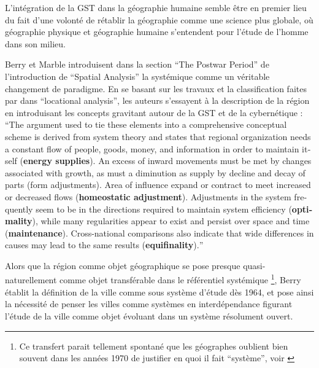 L'intégration de la GST dans la géographie humaine semble être en premier lieu du fait d'une volonté de rétablir la géographie comme une science plus globale, où géographie physique et géographie humaine s'entendent pour l'étude de l'homme dans son milieu.

Berry et Marble introduisent dans la section \foreignquote{english}{The Postwar Period} de l'introduction de \foreignquote{english}{Spatial Analysis} la systémique comme un véritable changement de paradigme. En se basant sur les travaux et la classification faites par \textcite{Haggett1965} dans \foreignquote{english}{locational analysis}, les auteurs s'essayent à la description de la région en introduisant les concepts gravitant autour de la GST et de la cybernétique : \foreignquote{english}{The argument used to tie these elements into a comprehensive conceptual scheme is derived from system theory and states that regional organization needs a constant flow of people, goods, money, and information in order to maintain itself (\textbf{energy supplies}). An excess of inward movements must be met by changes associated with growth, as must a diminution as supply by decline and decay of parts (form adjustments). Area of influence expand or contract to meet increased or decreased flows (\textbf{homeostatic adjustment}). Adjustments in the system frequently seem to be in the directions required to maintain system efficiency (\textbf{optimality}), while many regularities appear to exist and persist over space and time (\textbf{maintenance}). Cross-national comparisons also indicate that wide differences in causes may lead to the same results (\textbf{equifinality}).}

Alors que la région comme objet géographique se pose presque quasi-naturellement comme objet transférable dans le référentiel systémique \footnote{Ce transfert parait tellement spontané que les géographes oublient bien souvent dans les années 1970 de justifier en quoi il fait \enquote{système}, voir \autocite{Orain2001}}, Berry établit la définition de la ville comme sous système d'étude dès 1964, et pose ainsi la nécessité de penser les villes comme systèmes en interdépendance figurant l'étude de la ville comme objet évoluant dans un système résolument ouvert.

